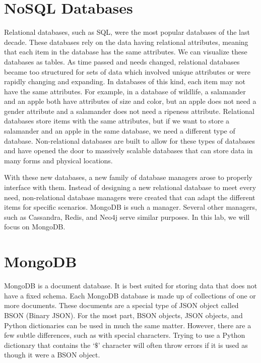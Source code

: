 \label{lab:mongodb}

\section*{NoSQL Databases}
Relational databases, such as SQL, were the most popular databases of the last decade.
These databases rely on the data having relational attributes, meaning that each item in the database has the same attributes.
We can visualize these databases as tables.
As time passed and needs changed, relational databases became too structured for sets of data which involved unique attributes or were rapidly changing and expanding.
In databases of this kind, each item may not have the same attributes.
For example, in a database of wildlife, a salamander and an apple both have attributes of size and color, but an apple does not need a gender attribute and a salamander does not need a ripeness attribute.
Relational databases store items with the same attributes, but if we want to store a salamander and an apple in the same database, we need a different type of database.
Non-relational databases are built to allow for these types of databases and have opened the door to massively scalable databases that can store data in many forms and physical locations.

With these new databases, a new family of database managers arose to properly interface with them.
Instead of designing a new relational database to meet every need, non-relational database managers were created that can adapt the different items for specific scenarios.
MongoDB is such a manager.
Several other managers, such as Cassandra, Redis, and Neo4j serve similar purposes.
In this lab, we will focus on MongoDB.

\section*{MongoDB}
MongoDB is a document database.
It is best suited for storing data that does not have a fixed schema.
Each MongoDB database is made up of collections of one or more documents.
These documents are a special type of JSON object called BSON (Binary JSON).
For the most part, BSON objects, JSON objects, and Python dictionaries can be used in much the same matter.
However, there are a few subtle differences, such as with special characters.
Trying to use a Python dictionary that contains the `$\$$' character will often throw errors if it is used as though it were a BSON object.

